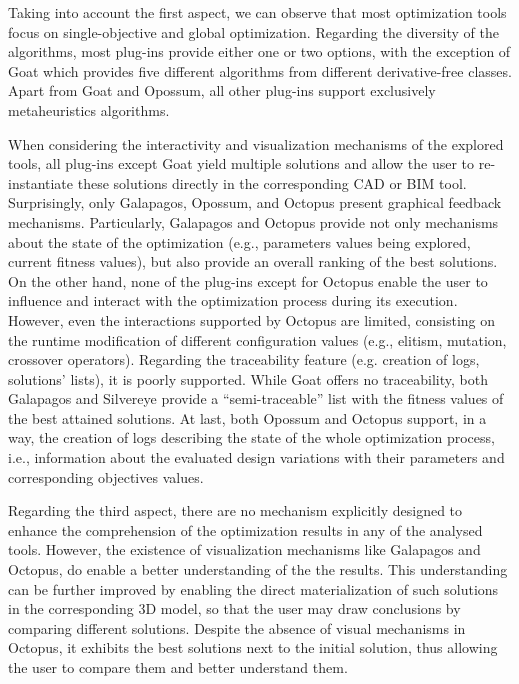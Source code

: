 	Taking into account the first aspect, we can observe that most optimization tools focus on single-objective and global optimization. Regarding the diversity of the algorithms, most plug-ins provide either one or two options, with the exception of Goat which provides five different algorithms from different derivative-free classes. Apart from Goat and Opossum, all other plug-ins support exclusively metaheuristics algorithms.
	
	When considering the interactivity and visualization mechanisms of the explored tools, all plug-ins except Goat yield multiple solutions and allow the user to re-instantiate these solutions directly in the corresponding \ac{CAD} or \ac{BIM} tool. Surprisingly, only Galapagos, Opossum, and Octopus present graphical feedback mechanisms. Particularly, Galapagos and Octopus provide not only mechanisms about the state of the optimization (e.g., parameters values being explored, current fitness values), but also provide an overall ranking of the best solutions. On the other hand, none of the plug-ins except for Octopus enable the user to influence and interact with the optimization process during its execution. However, even the interactions supported by Octopus are limited, consisting on the runtime modification of different configuration values (e.g., elitism, mutation, crossover operators). Regarding the traceability feature (e.g. creation of logs, solutions' lists), it is poorly supported. While Goat offers no traceability, both Galapagos and Silvereye provide a ``semi-traceable'' list with the fitness values of the best attained solutions. At last, both Opossum and Octopus support, in a way, the creation of logs describing the state of the whole optimization process, i.e., information about the evaluated design variations with their parameters and corresponding objectives values.
	
	Regarding the third aspect, there are no mechanism explicitly designed to enhance the comprehension of the optimization results in any of the analysed tools. However, the existence of visualization mechanisms like Galapagos and Octopus, do enable a better understanding of the the results. This understanding can be further improved by enabling the direct materialization of such solutions in the corresponding 3D model, so that the user may draw conclusions by comparing different solutions. Despite the absence of visual mechanisms in Octopus, it exhibits the best solutions next to the initial solution, thus allowing the user to compare them and better understand them.
	

